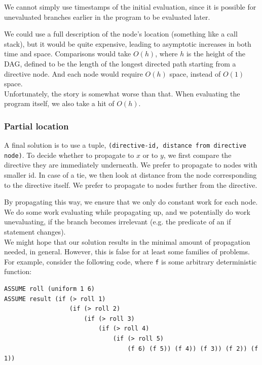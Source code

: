 \documentclass[10pt]{article}
\begin{document}
We cannot simply use timestamps of the initial evaluation, since it is possible for unevaluated branches earlier in the program to be evaluated later.  

We could use a full description of the node's location (something like a call stack), but it would be quite expensive, leading to asymptotic increases in both time and space.  Comparisons would take $O(h)$, where $h$ is the height of the DAG, defined to be the length of the longest directed path starting from a directive node.  And each node would require $O(h)$ space, instead of $O(1)$ space.  \\

Unfortunately, the story is somewhat worse than that.  When evaluating the program itself, we also take a hit of $O(h)$.  

\subsubsection{Partial location}
 
A final solution is to use a tuple, {\tt (directive-id, distance from directive node)}.  To decide whether to propagate to $x$ or to $y$, we first compare the directive they are immediately underneath.  We prefer to propagate to nodes with smaller id.  In case of a tie, we then look at distance from the node corresponding to the directive itself.  We prefer to propagate to nodes further from the directive.  

By propagating this way, we ensure that we only do constant work for each node.  We do some work evaluating while propagating up, and we potentially do work unevaluating, if the branch becomes irrelevant (e.g. the predicate of an if statement changes).  \\

We might hope that our solution results in the minimal amount of propagation needed, in general. However, this is false for at least some families of problems.  For example, consider the following code, where {\tt f} is some arbitrary deterministic function:

\begin{leftbar} \begin{small} \begin{verbatim}
ASSUME roll (uniform 1 6)
ASSUME result (if (> roll 1)
                  (if (> roll 2)
                      (if (> roll 3) 
                          (if (> roll 4) 
                              (if (> roll 5)
                                  (f 6) (f 5)) (f 4)) (f 3)) (f 2)) (f 1)) 
\end{verbatim} \end{small} \end{leftbar}
\end{document}
